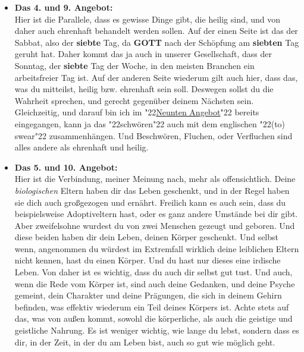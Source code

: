 \documentclass[12pt,a4paper]{article}
\newcommand{\Er}[0]{\textbf{ER}}
\newcommand{\Gott}[0]{\textbf{GOTT}}
\newcommand{\Seiner}[0]{\textbf{SEINER}}
\newcommand{\q}[1]{\char"22{#1}\char"22 }
\begin{document}
\begin{itemize}
					du springst aus dem Fenster,
					und sagst dir sowas wie:
					\q{Wenn es {\Gott} gibt, wird {\Er} mich auffangen.}.
					Damit w\"urdest du also einen Teil {\Seiner} Allmacht \q{stehlen} (wollen).
					Und auf der anderen Seite,
					gegen\"uber deinem Mitmenschen,
					ist es ja klar,
					dass gemeint ist,
					dass du deinem Mitmenschen nichts unberechtigt entwendest,
					also richtiger Diebstahl,
					oder auch Dienstleistungen unberechtigt in Anspruch nimmst:
					\q{Dienstleistungs-Diebstahl},
					was man \"ublicherweise mit \q{Betrug} bezeichnet.
			\item	\textbf{Das 4. und 9. Angebot:}
			\\		Hier ist die Parallele,
					dass es gewisse Dinge gibt,
					die heilig sind,
					und von daher auch ehrenhaft behandelt werden sollen.
					Auf der einen Seite ist das der Sabbat,
					also der \textbf{siebte} Tag,
					da {\Gott} nach der Sch\"opfung am \textbf{siebten} Tag geruht hat.
					Daher kommt das ja auch in unserer Gesellschaft,
					dass der Sonntag,
					der \textbf{siebte} Tag der Woche,
					in den meisten Branchen ein arbeitsfreier Tag ist.
					Auf der anderen Seite wiederum gilt auch hier,
					dass das,
					was du mitteilst,
					heilig bzw. ehrenhaft sein soll.
					Deswegen sollst du die Wahrheit sprechen,
					und gerecht gegen\"uber deinem N\"achsten sein.
					Gleichzeitig,
					und darauf bin ich im \q{\hyperref[DasNeunteAngebot]{Neunten Angebot}} bereits eingegangen,
					kann ja das \q{schw\"oren} auch mit dem englischen \q{(to) swear} zusammenh\"angen.
					Und Beschw\"oren,
					Fluchen,
					oder Verfluchen
					sind alles andere als ehrenhaft und heilig.
			\item	\textbf{Das 5. und 10. Angebot:}
			\\		Hier ist die Verbindung,
					meiner Meinung nach,
					mehr als offensichtlich.
					Deine \textit{biologischen} Eltern haben dir das Leben geschenkt,
					und in der Regel haben sie dich auch gro{\ss}gezogen und ern\"ahrt.
					Freilich kann es auch sein,
					dass du beispielsweise Adoptiveltern hast,
					oder es ganz andere Umst\"ande bei dir gibt.
					Aber zweifelsohne wurdest du von zwei Menschen gezeugt und geboren.
					Und diese beiden haben dir dein Leben,
					deinen K\"orper geschenkt.
					Und selbst wenn,
					angenommen du w\"urdest im Extremfall wirklich deine leiblichen Eltern nicht kennen,
					hast du einen K\"orper.
					Und du hast nur dieses eine irdische Leben.
					Von daher ist es wichtig,
					dass du auch dir selbst gut tust.
					Und auch,
					wenn die Rede vom K\"orper ist,
					sind auch deine Gedanken,
					und deine Psyche gemeint,
					dein Charakter und deine Pr\"agungen,
					die sich in deinem Gehirn befinden,
					was effektiv wiederum ein Teil deines K\"orpers ist.
					Achte stets auf das,
					was von au{\ss}en kommt,
					sowohl die k\"orperliche,
					als auch die geistige und geistliche Nahrung.
					Es ist weniger wichtig,
					wie lange du lebst,
					sondern dass es dir,
					in der Zeit,
					in der du am Leben bist,
					auch so gut wie m\"oglich geht.
		\end{itemize}
	
\end{document}
